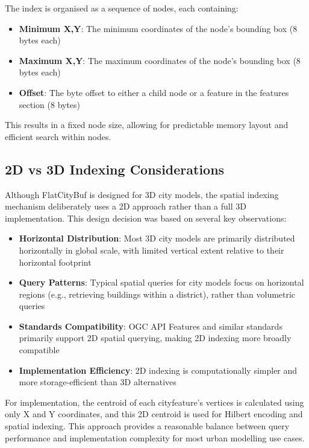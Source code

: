 The index is organised as a sequence of nodes, each containing:

\begin{itemize}
    \item \textbf{Minimum X,Y}: The minimum coordinates of the node's bounding box (8 bytes each)
    \item \textbf{Maximum X,Y}: The maximum coordinates of the node's bounding box (8 bytes each)
    \item \textbf{Offset}: The byte offset to either a child node or a feature in the features section (8 bytes)
\end{itemize}

This results in a fixed node size, allowing for predictable memory layout and efficient search within nodes.

\subsection{2D vs 3D Indexing Considerations}
\label{methodology:spatial_index:2d_vs_3d_indexing}

Although FlatCityBuf is designed for 3D city models, the spatial indexing mechanism deliberately uses a 2D approach rather than a full 3D implementation. This design decision was based on several key observations:

\begin{itemize}
    \item \textbf{Horizontal Distribution}: Most 3D city models are primarily distributed horizontally in global scale, with limited vertical extent relative to their horizontal footprint
    \item \textbf{Query Patterns}: Typical spatial queries for city models focus on horizontal regions (e.g., retrieving buildings within a district), rather than volumetric queries
    \item \textbf{Standards Compatibility}: OGC API Features and similar standards primarily support 2D spatial querying, making 2D indexing more broadly compatible 
    \item \textbf{Implementation Efficiency}: 2D indexing is computationally simpler and more storage-efficient than 3D alternatives
\end{itemize}

For implementation, the centroid of each \ac{cityfeature}'s vertices is calculated using only X and Y coordinates, and this 2D centroid is used for Hilbert encoding and spatial indexing. This approach provides a reasonable balance between query performance and implementation complexity for most urban modelling use cases.

